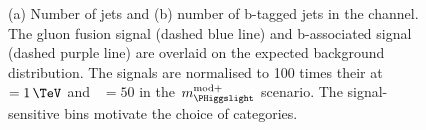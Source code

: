 \begin{figure}[h!]
\begin{center}
\end{center}
\caption[Number of jets and number of b-tagged jets in the \mutau channel, 
with the signal overlaid.]{(a) Number of jets and (b) number of b-tagged jets in the \mutau channel. The gluon fusion signal (dashed
blue line) and b-associated signal (dashed purple line) are overlaid on the expected background distribution. The signals
are normalised to 100 times their \xsbr at \mA~$=1\,\TeV$ and \tanb~$=50$ in the $m_{\PHiggslight}^{\text{mod+}}$
scenario. The signal-sensitive bins motivate the choice of categories.}
\label{fig:mssm_cats_mt}
\end{figure}

